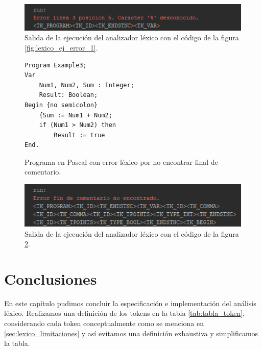 \begin{figure}[H]
\centering
\includegraphics[scale=1]{img/lexico/salida_lexico_ej_error_1.png}
\caption{Salida de la ejecución del analizador léxico con el código de la figura \ref{fig:lexico_ej_error_1}.}
\label{fig:lexico_ej_error_1_salida}
\end{figure}

\begin{figure}[H]
\begin{verbatim}
Program Example3;
Var       
    Num1, Num2, Sum : Integer;
    Result: Boolean;
Begin {no semicolon}
    {Sum := Num1 + Num2;
    if (Num1 > Num2) then
        Result := true
End.
\end{verbatim}
\caption{Programa en Pascal con error léxico por no encontrar final de comentario.}
\label{fig:lexico_ej_error_2}
\end{figure}

\begin{figure}[H]
\centering
\includegraphics[scale=1]{img/lexico/salida_lexico_ej_error_2.png}
\caption{Salida de la ejecución del analizador léxico con el código de la figura \ref{fig:lexico_ej_error_2}.}
\label{fig:lexico_ej_error_2_salida}
\end{figure}

\section{Conclusiones}
En este capítulo pudimos concluir la especificación e implementación del análisis léxico. Realizamos una definición de los tokens en la tabla \ref{tab:tabla_token}, considerando cada token conceptualmente como se menciona en \ref{sec:lexico_limitaciones} y así evitamos una definición exhaustiva y simplificamos la tabla. 

